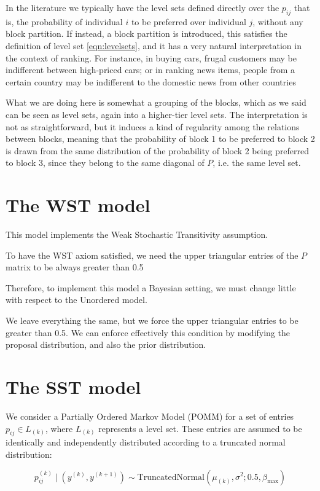 \documentclass[11pt]{amsart}
\begin{document}
In the literature we typically have the level sets defined directly over the $p_{ij}$ that is, the probability of individual $i$ to be preferred over individual $j$, without any block partition. If instead, a block partition is introduced, this satisfies the definition of level set \eqref{eqn:levelsets}, and it has a very natural interpretation in the context of ranking. For instance, in buying cars, frugal customers may be indifferent between high-priced cars; or in ranking news items, people from a certain country may be indifferent to the domestic news from other countries

What we are doing here is somewhat a grouping of the blocks, which as we said can be seen as level sets, again into a higher-tier level sets. The interpretation is not as straightforward, but it induces a kind of regularity among the relations between blocks, meaning that the probability of block 1 to be preferred to block 2 is drawn from the same distribution of the probability of block 2 being preferred to block 3, since they belong to the same diagonal of $P$, i.e. the same level set.

\section{The WST model}

This model implements the Weak Stochastic Transitivity assumption.

To have the WST axiom satisfied, we need the upper triangular entries of the $P$ matrix to be always greater than 0.5

Therefore, to implement this model a Bayesian setting, we must change little with respect to the Unordered model.

We leave everything the same, but we force the upper triangular entries to be greater than 0.5. We can enforce effectively this condition by modifying the proposal distribution, and also the prior distribution.

\section{The SST model}


We consider a Partially Ordered Markov Model (POMM) for a set of entries $p_{ij} \in L_{(k)}$, where $L_{(k)}$ represents a level set. These entries are assumed to be identically and independently distributed according to a truncated normal distribution:

\[
p_{ij}^{(k)} \mid (y^{(k)}, y^{(k+1)}) \sim \text{TruncatedNormal}(\mu_{(k)}, \sigma^{2}; 0.5, \beta_{\max})
\]
\end{document}
